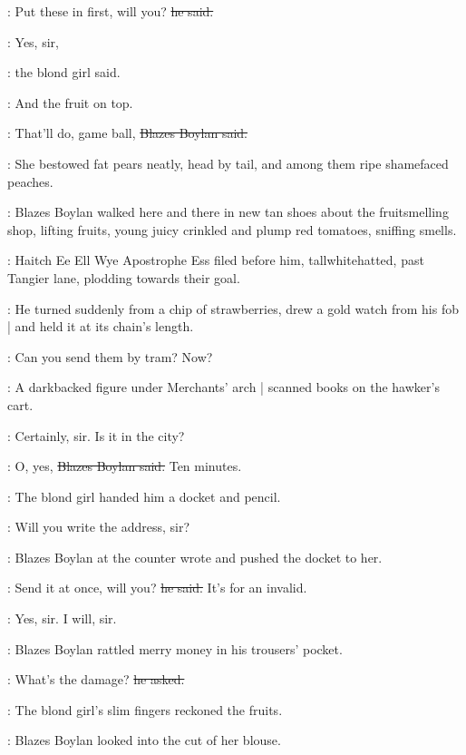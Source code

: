 \boylan:
Put these in first, will you?
\sout{he said.}

\blondgirl:
Yes, sir,

:
the blond girl said.

\blondgirl:
And the fruit on top.

\boylan:
That'll do, game ball,
\sout{Blazes Boylan said.}

:
She bestowed fat pears neatly,
head by tail,
and among them ripe shamefaced peaches.

:
Blazes Boylan walked here and there in new tan shoes
about the fruit\-smell\-ing shop,
lifting fruits,
young juicy crinkled and plump red tomatoes,
sniffing smells.

\begin{interject}
    :
    Haitch Ee Ell Wye Apostrophe Ess \stage{[H.E.L.Y.'S]}
    filed before him, tall\-white\-hatted,
    past Tangier lane,
    plodding towards their goal.
\end{interject}

:
He turned suddenly from a chip of strawberries,
drew a gold watch from his fob |
and held it at its chain's length.

\boylan:
Can you send them by tram? Now?

\begin{interject}
    :
    A darkbacked figure under Merchants' arch |
    scanned books on the hawker's cart.
\end{interject}

\blondgirl:
Certainly, sir.
Is it in the city?

\boylan:
O, yes,
\sout{Blazes Boylan said.}
Ten minutes.

:
The blond girl handed him a docket and pencil.

\blondgirl:
Will you write the address,
sir?

:
Blazes Boylan at the counter wrote
and pushed the docket to her.

\boylan:
Send it at once, will you?
\sout{he said.}
It's for an invalid.

\blondgirl:
Yes, sir. I will, sir.

:
Blazes Boylan rattled merry money in his trousers' pocket.

\boylan:
What's the damage?
\sout{he asked.}

:
The blond girl's slim fingers reckoned the fruits.

:
Blazes Boylan looked into the cut of her blouse.


